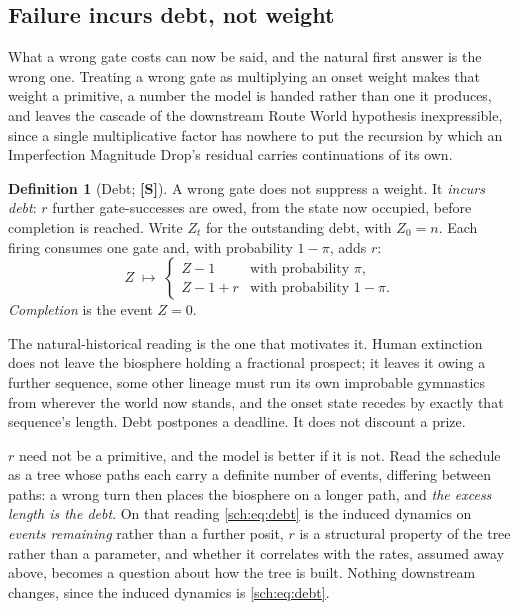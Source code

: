 \documentclass[11pt]{article}
\theoremstyle{plain}
\theoremstyle{definition}
\newtheorem{definition}[theorem]{Definition}
\theoremstyle{remark}
\begin{document}
\subsection{Failure incurs debt, not weight}\label{sch:subsub:debt}

What a wrong gate costs can now be said, and the natural first answer is
the wrong one. Treating a wrong gate as multiplying an onset weight
makes that weight a primitive, a number the model is handed rather
than one it produces, and leaves the cascade of
the downstream Route World hypothesis inexpressible, since a single multiplicative
factor has nowhere to put the recursion by which an Imperfection
Magnitude Drop's residual carries continuations of its own.

\begin{definition}[Debt; \textbf{[S]}]\label{sch:def:debt}
A wrong gate does not suppress a weight. It \emph{incurs debt}: $r$
further gate-successes are owed, from the state now occupied, before
completion is reached. Write $Z_t$ for the outstanding debt, with
$Z_0=n$. Each firing consumes one gate and, with probability $1-\pi$,
adds $r$:
\begin{equation}\label{sch:eq:debt}
Z\;\longmapsto\;
\begin{cases}
Z-1 & \text{with probability }\pi,\\
Z-1+r & \text{with probability }1-\pi .
\end{cases}
\end{equation}
\emph{Completion} is the event $Z=0$.
\end{definition}

The natural-historical reading is the one that motivates it. Human
extinction does not leave the biosphere holding a fractional prospect;
it leaves it owing a further sequence, some other lineage must run
its own improbable gymnastics from wherever the world now stands, and
the onset state recedes by exactly that sequence's length. Debt
postpones a deadline. It does not discount a prize.

$r$ need not be a primitive, and the model is better if it is not. Read
the schedule as a tree whose paths each carry a definite number of
events, differing between paths: a wrong turn then places the biosphere
on a longer path, and \emph{the excess length is the debt}. On that
reading \eqref{sch:eq:debt} is the induced dynamics on \emph{events
remaining} rather than a further posit, $r$ is a structural property of
the tree rather than a parameter, and whether it correlates with the
rates, assumed away above, becomes a question about how the tree
is built. Nothing downstream changes, since the induced dynamics is
\eqref{sch:eq:debt}.
\end{document}
